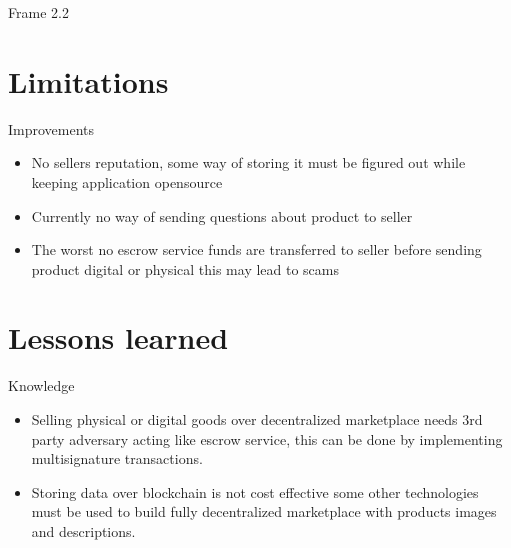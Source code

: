 \documentclass[9pt]{beamer}
\begin{document}
\begin{frame}{Frame 2.2}

\end{frame}

\section{Limitations}
    \begin{frame}{Improvements}
        \begin{itemize}
            \item No sellers reputation, some way of storing it must be figured out while keeping application opensource 
            \item Currently no way of sending questions about product to seller
            \item The worst no escrow service funds are transferred to seller before sending product digital or physical this may lead to scams
        \end{itemize}
    \end{frame}
\section{Lessons learned}
    \begin{frame}{Knowledge}
        \begin{itemize}
            \item Selling physical or digital goods over decentralized marketplace needs 3rd party adversary acting like escrow service, this can be done by implementing multisignature transactions. 
            
            \item Storing data over blockchain is not cost effective some other technologies must be used to build fully decentralized marketplace with products images and descriptions.
        \end{itemize}
    \end{frame}
\end{document}
